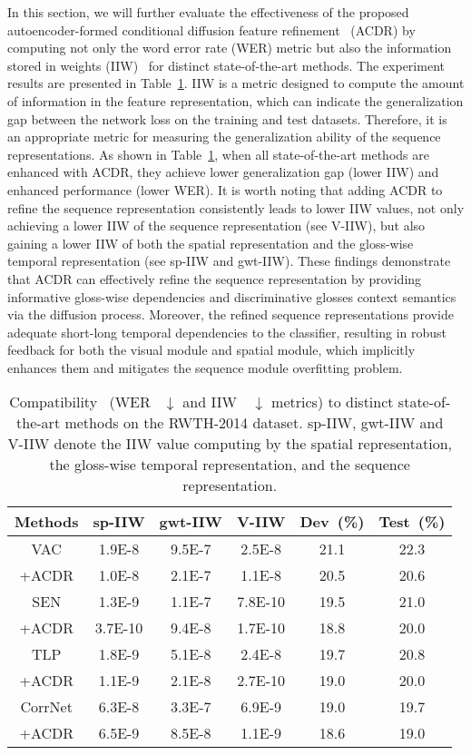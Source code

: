 \documentclass[sigconf]{acmart}
\begin{document}
In this section, we will further evaluate the effectiveness of the proposed autoencoder-formed conditional diffusion feature refinement~
(ACDR) by computing not only the word error rate (WER) metric but also the information stored in weights (IIW)~\cite{PIB2022} for distinct state-of-the-art methods. The experiment results are presented in Table~\ref{Table:sota_wer_iiw}.
IIW is a metric designed to compute the amount of information in the feature representation, which can indicate the generalization gap between the network loss on the training and test datasets. 
Therefore, it is an appropriate metric for measuring the generalization ability of the sequence representations. As shown in Table~\ref{Table:sota_wer_iiw}, when all state-of-the-art methods are enhanced with ACDR, they achieve lower generalization gap (lower IIW) and enhanced performance (lower WER).
It is worth noting that adding ACDR to refine the sequence representation consistently leads to lower IIW values, not only achieving a lower IIW of the sequence representation (see V-IIW), but also gaining a lower IIW of both the spatial representation and the gloss-wise temporal representation (see sp-IIW and gwt-IIW). 
These findings demonstrate that ACDR can effectively refine the sequence representation by providing informative gloss-wise dependencies and discriminative glosses context semantics via the diffusion process. Moreover, the refined sequence representations provide adequate short-long temporal dependencies to the classifier, resulting in robust feedback for both the visual module and spatial module, which implicitly enhances them and mitigates the sequence module overfitting problem.


\setlength{\tabcolsep}{4pt}
\begin{table}[!htbp]
\centering
\fontsize{9}{12}\selectfont
\caption{Compatibility ~(WER ~$\downarrow$ and IIW~\cite{PIB2022}~$\downarrow$ metrics) to distinct state-of-the-art methods on the {RWTH-2014} dataset. sp-IIW, {gwt}-IIW and V-IIW denote the IIW value computing by the spatial representation, the gloss-wise temporal representation, and the sequence representation.}
\begin{tabular}{c|c|c|c|c|c} 
\toprule
Methods & sp-IIW & {gwt}-IIW &V-IIW & Dev~(\%) & Test~(\%) \\ \midrule {VAC} & 1.9E-8 & 9.5E-7 & 2.5E-8 & 21.1 & 22.3 \\ {+ACDR} &  1.0E-8 & 2.1E-7 & 1.1E-8 & 20.5 & 20.6 \\ \midrule {SEN} & 1.3E-9 & 1.1E-7  & 7.8E-10 & 19.5 & 21.0 \\ {+ACDR} & 3.7E-10 & 9.4E-8 &1.7E-10 & 18.8 & 20.0 \\ \midrule 
        {TLP} & 1.8E-9 & 5.1E-8  & 2.4E-8 & 19.7 & 20.8 \\ {+ACDR} &1.1E-9 & 2.1E-8  & 2.7E-10 & 19.0 & 20.0 \\ \midrule 
       {CorrNet} & 6.3E-8 & 3.3E-7  & 6.9E-9 & 19.0 & 19.7 \\ {+ACDR} & 6.5E-9 & 8.5E-8 &1.1E-9 & 18.6 & 19.0 \\  


        \bottomrule
    \end{tabular}
    \label{Table:sota_wer_iiw}
\end{table}
\end{document}
